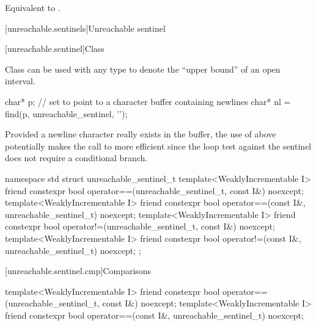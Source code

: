 \begin{itemdescr}
\pnum
\effects Equivalent to .
\end{itemdescr}

[unreachable.sentinels]{Unreachable sentinel}

[unreachable.sentinel]{Class }

%
\pnum
Class  can be used with
any  type
to denote the ``upper bound'' of an open interval.

\pnum
\begin{example}
\begin{codeblock}
char* p;
// set  to point to a character buffer containing newlines
char* nl = find(p, unreachable_sentinel, '\n');
\end{codeblock}

Provided a newline character really exists in the buffer, the use of
 above potentially makes the call to  more
efficient since the loop test against the sentinel does not require a
conditional branch.
\end{example}

\begin{codeblock}
namespace std {
  struct unreachable_sentinel_t {
    template<WeaklyIncrementable I>
      friend constexpr bool operator==(unreachable_sentinel_t, const I&) noexcept;
    template<WeaklyIncrementable I>
      friend constexpr bool operator==(const I&, unreachable_sentinel_t) noexcept;
    template<WeaklyIncrementable I>
      friend constexpr bool operator!=(unreachable_sentinel_t, const I&) noexcept;
    template<WeaklyIncrementable I>
      friend constexpr bool operator!=(const I&, unreachable_sentinel_t) noexcept;
  };
}
\end{codeblock}

[unreachable.sentinel.cmp]{Comparisons}

%
%
\begin{itemdecl}
template<WeaklyIncrementable I>
  friend constexpr bool operator==(unreachable_sentinel_t, const I&) noexcept;
template<WeaklyIncrementable I>
  friend constexpr bool operator==(const I&, unreachable_sentinel_t) noexcept;
\end{itemdecl}

